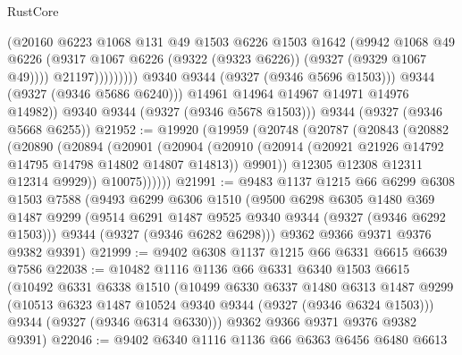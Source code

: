 \begin{lexlean}{RustCore}
\begin{coremodule}
                              (@20160
                                @6223
                                @1068
                                @131
                                @49
                                @1503
                                @6226
                                @1503
                                @1642
                                (@9942
                                  @1068
                                  @49
                                  @6226
                                  (@9317
                                    @1067
                                    @6226
                                    (@9322 (@9323 @6226))
                                    (@9327 (@9329 @1067 @49))))
                                @21197)))))))))
              @9340
              @9344
              (@9327 (@9346 @5696 @1503)))
            @9344
            (@9327 (@9346 @5686 @6240)))
          @14961
          @14964
          @14967
          @14971
          @14976
          @14982))
      @9340
      @9344
      (@9327 (@9346 @5678 @1503)))
    @9344
    (@9327 (@9346 @5668 @6255))
@21952 := @19920
    (@19959
      (@20748
        (@20787
          (@20843
            (@20882
              (@20890
                (@20894
                  (@20901
                    (@20904
                      (@20910
                        (@20914 (@20921 @21926 @14792 @14795 @14798 @14802 @14807 @14813))
                        @9901))
                    @12305
                    @12308
                    @12311
                    @12314
                    @9929))
                @10075))))))
@21991 := @9483
    @1137
    @1215
    @66
    @6299
    @6308
    @1503
    @7588
    (@9493
      @6299
      @6306
      @1510
      (@9500
        @6298
        @6305
        @1480
        @369
        @1487
        @9299
        (@9514 @6291 @1487 @9525 @9340 @9344 (@9327 (@9346 @6292 @1503)))
        @9344
        (@9327 (@9346 @6282 @6298)))
      @9362
      @9366
      @9371
      @9376
      @9382
      @9391)
@21999 := @9402 @6308 @1137 @1215 @66 @6331 @6615 @6639 @7586
@22038 := @10482
    @1116
    @1136
    @66
    @6331
    @6340
    @1503
    @6615
    (@10492
      @6331
      @6338
      @1510
      (@10499
        @6330
        @6337
        @1480
        @6313
        @1487
        @9299
        (@10513 @6323 @1487 @10524 @9340 @9344 (@9327 (@9346 @6324 @1503)))
        @9344
        (@9327 (@9346 @6314 @6330)))
      @9362
      @9366
      @9371
      @9376
      @9382
      @9391)
@22046 := @9402 @6340 @1116 @1136 @66 @6363 @6456 @6480 @6613

\end{coremodule}
\end{lexlean}
